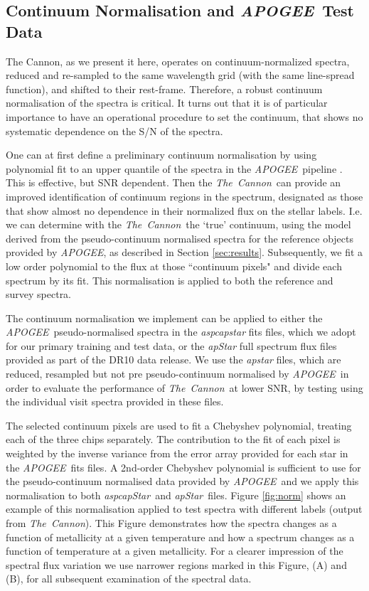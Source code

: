\documentclass[12pt, preprint]{aastex}
\newcommand{\tc}{\textsl{The~Cannon}}
\newcommand{\apogee}{\textsl{APOGEE}}
\newcommand{\aspcapstar}{\textsl{aspcapStar}}
\newcommand{\apstar}{\textsl{apStar}}
\begin{document}
\subsection{Continuum Normalisation and \apogee\ Test Data}

The Cannon, as we present it here, operates on continuum-normalized spectra, reduced and re-sampled to the same wavelength grid
 (with the same line-spread function), and shifted to their rest-frame. 
 Therefore, a robust continuum normalisation of the spectra is critical.
  It turns out that it is of particular importance to have an operational procedure to set the continuum,
   that shows no systematic dependence on the S/N of the spectra.

One can at first define a preliminary continuum normalisation by using polynomial fit to an upper quantile of the spectra
 in the \apogee\ pipeline \citep{Meszaros2013}. This is effective, but SNR dependent.
Then the \tc\ can provide an improved identification of continuum regions in the spectrum,
designated as those that show almost no dependence in their normalized flux on the stellar labels.
I.e. we can determine with the \tc\ the `true' continuum, using the model derived from the pseudo-continuum normalised spectra for the reference objects provided by \apogee, as described in Section \ref{sec:results}. Subsequently, we fit a low order polynomial to the flux at those ``continuum pixels"
and divide each spectrum by its fit. This normalisation is applied to both the reference and survey
spectra.

The continuum normalisation we implement can be applied to either the \apogee\ pseudo-normalised spectra in the \textit{aspcapstar} fits files, which we adopt for our primary training and test data, or the \textit{apStar} full spectrum flux files provided as part of the DR10 data release.
 We use the \textit{apstar} files, which are reduced, resampled but not pre pseudo-continuum normalised by \apogee\, in order to evaluate the performance of \tc\ at lower SNR, by testing using the individual visit spectra provided in these files.  

The selected continuum pixels are used to fit a Chebyshev polynomial, treating each of the three chips separately. 
The contribution to the fit of each pixel is weighted by the inverse variance from the error array provided for each star in the \apogee\ fits files. A 2nd-order Chebyshev polynomial is sufficient to use for the pseudo-continuum normalised data provided by \apogee\ and we apply this normalisation to both \aspcapstar\ and  \apstar\ files. 
Figure \ref{fig:norm} shows an example of this normalisation applied to test spectra with different labels (output from \tc). 
This Figure demonstrates how the spectra changes as a function of metallicity at a given temperature and how a spectrum changes as a function of temperature at a given metallicity. 
For a clearer impression of the spectral flux variation we use narrower regions marked in this Figure, (A) and (B), for all subsequent examination of the spectral data. 
\end{document}

